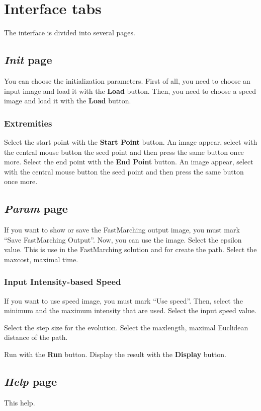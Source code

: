\documentclass{article}
\begin{document}
\section{Interface tabs}

The interface is divided into several pages.

\subsection{\emph{Init} page}

You can choose the initialization parameters.
First of all, you need to choose an input image and load it with the {\bf Load} button. 
Then, you need to choose a speed image and load it with the {\bf Load} button.

\subsubsection{Extremities}
Select the start point with the {\bf Start Point} button. An image appear, select with the central mouse button the seed point and then press the same button once more.
Select the end point with the {\bf End Point} button. An image appear, select with the central mouse button the seed point and then press the same button once more.


\subsection{\emph{Param} page}
If you want to show or save the FastMarching output image, you must mark ``Save FastMarching Output''. Now, you can use the image.
Select the epsilon value. This is use in the FastMarching solution and for create the path.
Select the maxcost, maximal time.

\subsubsection{Input Intensity-based Speed}
If you want to use speed image, you must mark ``Use speed''.
Then, select the minimum and the maximum intensity that are used.
Select the input speed value.


Select the step size for the evolution.
Select the maxlength, maximal Euclidean distance of the path.

Run with the {\bf Run} button.
Display the result with the {\bf Display} button.

\subsection{\emph{Help} page}
This help.
\end{document}
